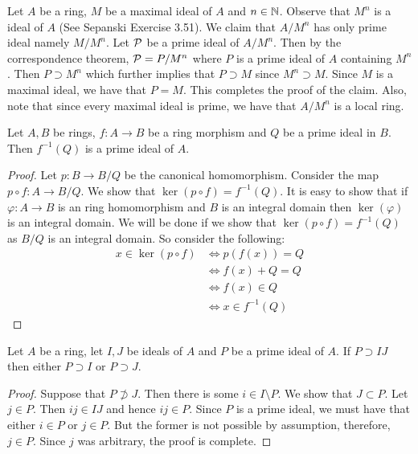 \begin{example}

    Let $A$ be a ring, $M$ be a maximal ideal of $A$ and $n\in \mathbb N$. Observe that $M^n$ is a ideal of $A$ (See Sepanski Exercise 3.51). We claim that $A/ M^n$ has only prime ideal namely $M / M^n$. Let ${\cal P}$ be a prime ideal of $A / M^n$. Then by the correspondence theorem, ${\cal P} = P/ M^n$ where $P$ is a prime ideal of $A$ containing $M^n$. Then $P\supset M^n$ which further implies that $P \supset M$ since $M^n \supset M$. Since $M$ is a maximal ideal, we have that $P=M$. This completes the proof of the claim. Also, note that since every maximal ideal is prime, we have that $A/M^n$ is a local ring.

\end{example}
 
\begin{lemma}
    Let $A, B$ be rings, $f:A\to B$ be a ring morphism and $Q$ be a prime ideal in $B$. Then $f^{-1} \left( Q \right)$ is a prime ideal of $A$. 
    \label{lemma:inverse-image-of-prime-ideal}
\end{lemma}
\begin{proof}
    Let $p: B \to B/Q$ be the canonical homomorphism. Consider the map $p \circ f : A \to B/Q$. We show that $\ker (p \circ f) = f^{-1} \left( Q \right)$. It is easy to show that if $\varphi : A \to B$ is an ring homomorphism and $B$ is an integral domain then $\ker (\varphi )$ is an integral domain. We will be done if we show that $\ker (p \circ f) = f^{-1}\left( Q \right)$ as $B/Q$ is an integral domain. So consider the following:
    \begin{align*}
	x \in \ker \left( p \circ f \right) & \Leftrightarrow p (f(x)) = Q \\
					& \Leftrightarrow f(x) + Q = Q \\
					& \Leftrightarrow f(x) \in Q \\
					& \Leftrightarrow x \in f^{-1} \left( Q \right)
    \end{align*}
\end{proof}


\begin{lemma}
    Let $A$ be a ring, let $I,J $ be ideals of $A$ and $P$ be a prime ideal of $A$. If $P \supset IJ$ then either $P \supset I$ or $P\supset J$.
    \label{lemma:equiv-prime}
\end{lemma}
\begin{proof}
    Suppose that $P \not \supset J$. Then there is some $i\in I \setminus P$. We show that $J \subset P$. Let $j \in P$. Then $ij \in IJ$ and hence $ij \in P$. Since $P$ is a prime ideal, we must have that either $i\in P $ or $j \in P$. But the former is not possible by assumption, therefore, $j\in P$. Since $j$ was arbitrary, the proof is complete.
\end{proof}


